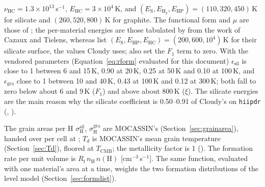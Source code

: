 $\nu_{\mathrm{HC}}=1.3\times10^{13}$\,s$^{-1}$, $E_{\mathrm{HC}}=3\times10^4$\,K, and
$(E_{\mathrm S},E_{\mathrm{H_2}},E_{\mathrm{HP}})=(110,320,450)$\,K for silicate and
$(260,520,800)$\,K for graphite. The functional form and $\mu$ are those of
\citet{CazauxTielens2002}; the per-material energies are those tabulated by
\citet[Table~C.1]{Rollig2013} from the work of Cazaux and Tielens, whereas
\citet[Table~1]{CazauxTielens2002} list $(E_{\mathrm S},E_{\mathrm{HP}},E_{\mathrm{HC}})=(200,600,10^4)$\,K
for their silicate surface, the values Cloudy uses; \citet{Rollig2013} also
set the $F_1$ term to zero. With the vendored parameters
(Equation~\ref{eq:rform} evaluated for this document) $\epsilon_{\mathrm{sil}}$ is
close to 1 between 6 and 15\,K, 0.90 at 20\,K, 0.25 at 50\,K and 0.10 at 100\,K, and
$\epsilon_{\mathrm{gra}}$ close to 1 between 10 and 40\,K, 0.43 at 100\,K and 0.12 at 300\,K;
both fall to zero below about 6 and 9\,K ($F_1$) and above about 800\,K ($\xi$).
The silicate energies are the main reason why the silicate coefficient is
0.50--0.91 of Cloudy's on \texttt{hiipdr} (, ).

The grain areas per H $\sigma^{\mathrm{sil}}_{\mathrm H}$, $\sigma^{\mathrm{gra}}_{\mathrm H}$ are
MOCASSIN's (Section~\ref{sec:grainarea}), handed over per cell at
; $T_d$ is MOCASSIN's mean grain temperature
(Section~\ref{sec:Td}), floored at $T_{\mathrm{CMB}}$; the metallicity factor is 1
(). The formation rate per unit volume is
$R_{\mathrm f}\,n_{\mathrm H}\,n(\mathrm H)$ [cm$^{-3}$\,s$^{-1}$]. The same function, evaluated
with one material's area at a time, weights the two formation distributions of
the level model (Section~\ref{sec:formdist}).
